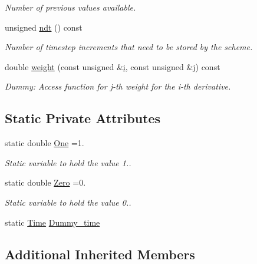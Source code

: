 \begin{DoxyCompactItemize}
\begin{DoxyCompactList}\small\item\em Number of previous values available. \end{DoxyCompactList}\item 
unsigned \hyperlink{classoomph_1_1Steady_add50fd00901dc87069f2404014d699f7}{ndt} () const
\begin{DoxyCompactList}\small\item\em Number of timestep increments that need to be stored by the scheme. \end{DoxyCompactList}\item 
double \hyperlink{classoomph_1_1Steady_a34c993309f0a5c4c1cbf35ceef86f01b}{weight} (const unsigned \&\hyperlink{cfortran_8h_adb50e893b86b3e55e751a42eab3cba82}{i}, const unsigned \&j) const
\begin{DoxyCompactList}\small\item\em Dummy\+: Access function for j-\/th weight for the i-\/th derivative. \end{DoxyCompactList}\end{DoxyCompactItemize}
\subsection*{Static Private Attributes}
\begin{DoxyCompactItemize}
\item 
static double \hyperlink{classoomph_1_1Steady_a4bbc07dac00bd37fa208731f3bd52a0b}{One} =1.
\begin{DoxyCompactList}\small\item\em Static variable to hold the value 1.. \end{DoxyCompactList}\item 
static double \hyperlink{classoomph_1_1Steady_aaafcc85863ac0695b273a98fd4525196}{Zero} =0.
\begin{DoxyCompactList}\small\item\em Static variable to hold the value 0.. \end{DoxyCompactList}\item 
static \hyperlink{classoomph_1_1Time}{Time} \hyperlink{classoomph_1_1Steady_a5ef22ed9000bea59c719d9e3e98df267}{Dummy\+\_\+time}
\end{DoxyCompactItemize}
\subsection*{Additional Inherited Members}


